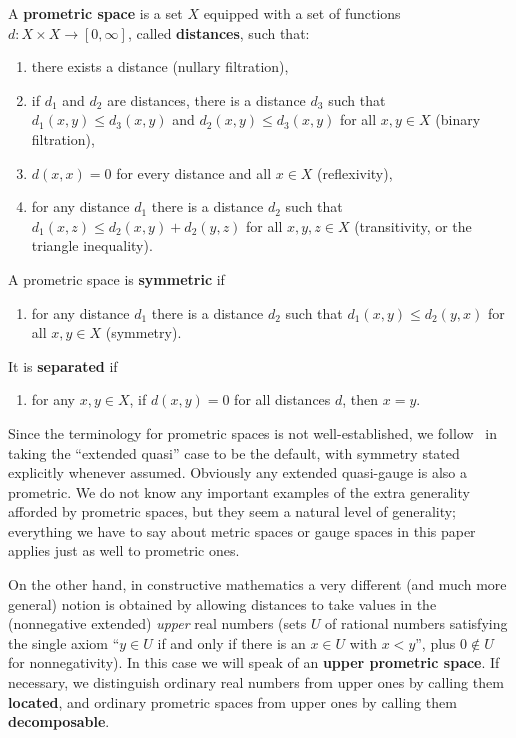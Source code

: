 \documentclass{article}
\def\Rp{[0,\infty]}
\begin{document}
\begin{defn}
  A \textbf{prometric space} is a set $X$ equipped with a set of functions $d:X\times X\to\Rp$, called \textbf{distances}, such that:
  \begin{enumerate}
  \item there exists a distance (nullary filtration),
  \item if $d_1$ and $d_2$ are distances, there is a distance $d_3$ such that $d_1(x,y)\le d_3(x,y)$ and $d_2(x,y)\le d_3(x,y)$ for all $x,y\in X$ (binary filtration),
  \item $d(x,x)=0$ for every distance and all $x\in X$ (reflexivity),
  \item for any distance $d_1$ there is a distance $d_2$ such that $d_1(x,z)\le d_2(x,y)+d_2(y,z)$ for all $x,y,z\in X$ (transitivity, or the triangle inequality).
  \end{enumerate}
  A prometric space is \textbf{symmetric} if
  \begin{enumerate}[resume]
  \item for any distance $d_1$ there is a distance $d_2$ such that $d_1(x,y)\le d_2(y,x)$ for all $x,y\in X$ (symmetry).
  \end{enumerate}
  It is \textbf{separated} if
  \begin{enumerate}[resume]
  \item for any $x,y\in X$, if $d(x,y)=0$ for all distances $d$, then $x=y$.
  \end{enumerate}
\end{defn}

Since the terminology for prometric spaces is not well-established, we follow~\cite{cht:one-setting} in taking the ``extended quasi'' case to be the default, with symmetry stated explicitly whenever assumed.
Obviously any extended quasi-gauge is also a prometric.
We do not know any important examples of the extra generality afforded by prometric spaces, but they seem a natural level of generality; everything we have to say about metric spaces or gauge spaces in this paper applies just as well to prometric ones.

On the other hand, in constructive mathematics a very different (and much more general) notion is obtained by allowing distances to take values in the (nonnegative extended) \emph{upper} real numbers (sets $U$ of rational numbers satisfying the single axiom ``$y\in U$ if and only if there is an $x\in U$ with $x<y$'', plus $0\notin U$ for nonnegativity).
In this case we will speak of an \textbf{upper prometric space}.
If necessary, we distinguish ordinary real numbers from upper ones by calling them \textbf{located}, and ordinary prometric spaces from upper ones by calling them \textbf{decomposable}.
\end{document}
